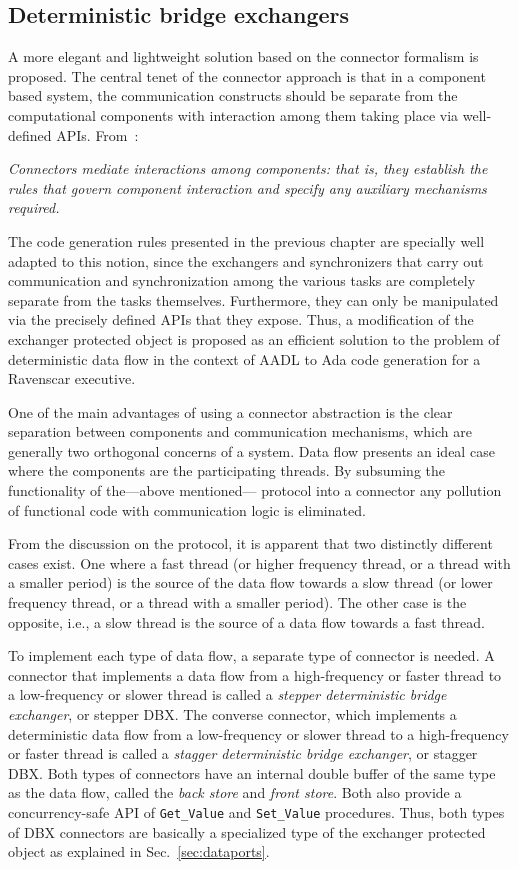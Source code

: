 \subsection{Deterministic bridge exchangers}
\label{sec:DBX}
A more elegant and lightweight solution based on the connector
formalism is proposed. The central tenet of the connector approach is
that in a component based system, the communication constructs should
be separate from the computational components with interaction among
them taking place via well-defined APIs. From~\cite{mehta@icse00}:

\emph{Connectors mediate interactions among components: that is, they
  establish the rules that govern component interaction and specify
  any auxiliary mechanisms required.}

The code generation rules presented in the previous chapter are
specially well adapted to this notion, since the exchangers and
synchronizers that carry out communication and synchronization among
the various tasks are completely separate from the tasks
themselves. Furthermore, they can only be manipulated via the
precisely defined APIs that they expose. Thus, a modification of the
exchanger protected object is proposed as an efficient solution to the
problem of deterministic data flow in the context of AADL to Ada code
generation for a Ravenscar executive.

One of the main advantages of using a connector abstraction is the
clear separation between components and communication mechanisms,
which are generally two orthogonal concerns of a system. Data flow
presents an ideal case where the components are the participating
threads. By subsuming the functionality of the---above mentioned---
protocol into a connector any pollution of functional code with
communication logic is eliminated.

From the discussion on the protocol, it is apparent that two
distinctly different cases exist. One where a fast thread (or higher
frequency thread, or a thread with a smaller period) is the source of
the data flow towards a slow thread (or lower frequency thread, or a
thread with a smaller period). The other case is the opposite, i.e., a
slow thread is the source of a data flow towards a fast thread.

To implement each type of data flow, a separate type of connector is
needed. A connector that implements a data flow from a high-frequency
or faster thread to a low-frequency or slower thread is called a
\emph{stepper deterministic bridge exchanger}, or stepper DBX. The
converse connector, which implements a deterministic data flow from a
low-frequency or slower thread to a high-frequency or faster thread is
called a \emph{stagger deterministic bridge exchanger}, or stagger
DBX. Both types of connectors have an internal double buffer of the
same type as the data flow, called the \emph{back store} and
\emph{front store}. Both also provide a concurrency-safe API of
\texttt{Get\_Value} and \texttt{Set\_Value} procedures. Thus, both
types of DBX connectors are basically a specialized type of the
exchanger protected object as explained in Sec.~\ref{sec:dataports}.

